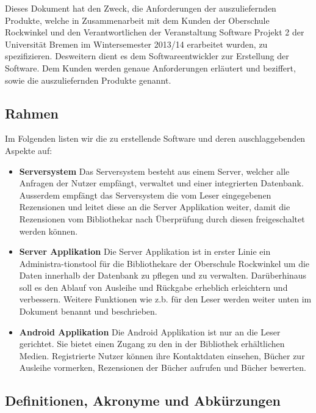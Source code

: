 \documentclass[fontsize=12pt,paper=a4,twoside]{scrartcl}
\begin{document}
Dieses Dokument hat den Zweck, die Anforderungen der auszuliefernden 
Produkte, welche in Zusammenarbeit mit dem Kunden der Oberschule 
Rockwinkel und den Verantwortlichen der Veranstaltung Software Projekt 2 
der Universität Bremen im Wintersemester 2013/14 erarbeitet wurden, zu spezifizieren. Desweitern dient es dem Softwareentwickler zur Erstellung der Software.
Dem Kunden werden genaue Anforderungen erläutert und beziffert, sowie die auszuliefernden Produkte genannt.


\subsection{Rahmen}

Im Folgenden listen wir die zu erstellende Software und deren auschlaggebenden Aspekte auf:

\begin{itemize}

\item{\textbf{Serversystem}}
Das Serversystem besteht aus einem Server, welcher alle Anfragen der Nutzer empfängt, verwaltet und einer integrierten Datenbank. Ausserdem empfängt das Serversystem die vom Leser eingegebenen Rezensionen und leitet diese an die Server Applikation weiter, damit die Rezensionen vom Bibliothekar nach Überprüfung durch diesen freigeschaltet werden können.

\item{\textbf{Server Applikation}}
Die Server Applikation ist in erster Linie ein Administra-tionstool für die Bibliothekare der Oberschule Rockwinkel um die Daten innerhalb der Datenbank zu pflegen und zu verwalten. Darüberhinaus soll es den Ablauf von Ausleihe und Rückgabe erheblich erleichtern und verbessern. Weitere Funktionen wie z.b. für den Leser werden weiter unten im Dokument benannt und beschrieben.

\item{\textbf{Android Applikation}}
Die Android Applikation ist nur an die Leser gerichtet. Sie bietet einen Zugang zu den in der Bibliothek erhältlichen Medien. Registrierte Nutzer können ihre Kontaktdaten einsehen, Bücher zur Ausleihe vormerken, Rezensionen der Bücher aufrufen und Bücher bewerten.
\end{itemize}

\subsection{Definitionen, Akronyme und Abkürzungen}
\end{document}
